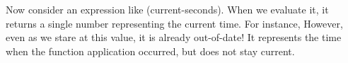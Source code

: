 \secdown

Now consider an expression like (current-seconds). When we evaluate it, it
returns a single number representing the current time. For instance,
However, even as we stare at this value, it is already out-of-date! It
represents the time when the function application occurred, but does not stay
current.





\secup
